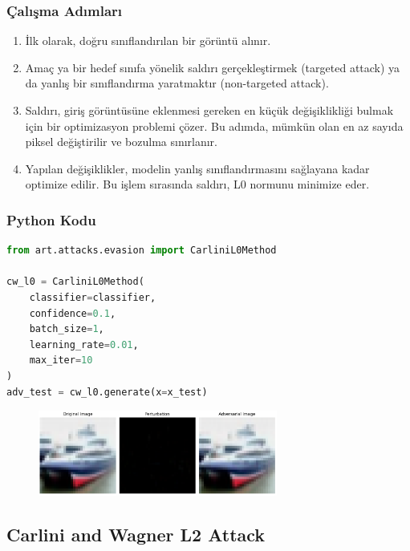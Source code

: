 \subsubsection{Çalışma Adımları}

\begin{enumerate}
    \item İlk olarak, doğru sınıflandırılan bir görüntü alınır.
    \item Amaç ya bir hedef sınıfa yönelik saldırı gerçekleştirmek (targeted attack) ya da yanlış bir sınıflandırma yaratmaktır (non-targeted attack).
    \item Saldırı, giriş görüntüsüne eklenmesi gereken en küçük değişiklikliği bulmak için bir optimizasyon problemi çözer. Bu adımda, mümkün olan en az sayıda piksel değiştirilir ve bozulma sınırlanır.
    \item Yapılan değişiklikler, modelin yanlış sınıflandırmasını sağlayana kadar optimize edilir. Bu işlem sırasında saldırı, L0 normunu minimize eder.
\end{enumerate}

\subsubsection{Python Kodu}

\begin{lstlisting}[language=Python]
from art.attacks.evasion import CarliniL0Method

cw_l0 = CarliniL0Method(
    classifier=classifier, 
    confidence=0.1, 
    batch_size=1, 
    learning_rate=0.01, 
    max_iter=10
)
adv_test = cw_l0.generate(x=x_test)
\end{lstlisting}

\begin{figure}[h]
    \centering
    \includegraphics[width=0.7\textwidth]{images/cw_l0_results.png}
    \caption{}
\end{figure}

\newpage

\subsection{Carlini and Wagner L2 Attack}

